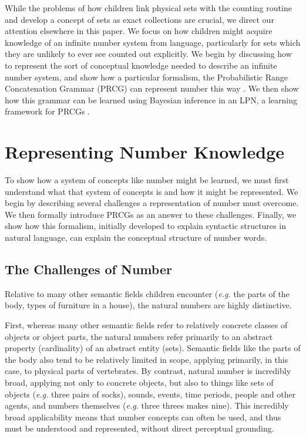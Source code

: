 \documentclass[10pt,letterpaper]{article}
\begin{document}
While the problems of how children link physical sets with the
counting routine and develop a concept of sets as exact collections
are crucial, we direct our attention elsewhere in this paper. We focus
on how children might acquire knowledge of an infinite number system
from language, particularly for sets which they are unlikely to ever
see counted out explicitly. We begin by discussing how to represent
the sort of conceptual knowledge needed to describe an infinite number
system, and show how a particular formalism, the Probabilistic Range
Concatenation Grammar (PRCG) can represent number this way
\citep{boullier2005range}. We then show how this grammar can be
learned using Bayesian inference in an LPN, a learning framework for
PRCGs \citep{DecRulTenming}.

\section{Representing Number Knowledge}

To show how a system of concepts like number might be learned, we must
first understand what that system of concepts is and how it might be
represented. We begin by describing several challenges a
representation of number must overcome. We then formally introduce
PRCGs as an answer to these challenges. Finally, we show how this
formalism, initially developed to explain syntactic structures in
natural language, can explain the conceptual structure of number
words.

\subsection{The Challenges of Number}

Relative to many other semantic fields children encounter ({\it e.g.}
the parts of the body, types of furniture in a house), the natural
numbers are highly distinctive.

First, whereas many other semantic fields refer to relatively concrete
classes of objects or object parts, the natural numbers refer
primarily to an abstract property (cardinality) of an abstract entity
(sets). Semantic fields like the parts of the body also tend to be
relatively limited in scope, applying primarily, in this case, to
physical parts of vertebrates. By contrast, natural number is
incredibly broad, applying not only to concrete objects, but also to
things like sets of objects ({\it e.g.}  three pairs of socks),
sounds, events, time periods, people and other agents, and numbers
themselves ({\it e.g.}  three threes makes nine). This incredibly
broad applicability means that number concepts can often be used, and
thus must be understood and represented, without direct perceptual
grounding.
\end{document}
